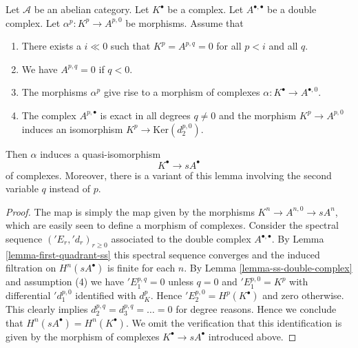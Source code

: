 \begin{lemma}
\label{lemma-double-complex-gives-resolution}
Let $\mathcal{A}$ be an abelian category.
Let $K^\bullet$ be a complex.
Let $A^{\bullet, \bullet}$ be a double complex.
Let $\alpha^p : K^p \to A^{p, 0}$ be morphisms.
Assume that
\begin{enumerate}
\item There exists a $i \ll 0$ such that
$K^p = A^{p, q} = 0$ for all $p < i$ and all $q$.
\item We have $A^{p, q} = 0$ if $q < 0$.
\item The morphisms $\alpha^p$ give rise to a morphism
of complexes $\alpha : K^\bullet \to A^{\bullet, 0}$.
\item The complex $A^{p, \bullet}$ is exact in all degrees
$q \not = 0$ and the morphism $K^p \to A^{p, 0}$ induces
an isomorphism $K^p \to \text{Ker}(d_2^{p, 0})$.
\end{enumerate}
Then $\alpha$ induces a quasi-isomorphism
$$
K^\bullet \longrightarrow sA^\bullet
$$
of complexes.
Moreover, there is a variant of this lemma involving the second
variable $q$ instead of $p$.
\end{lemma}

\begin{proof}
The map is simply the map given by the morphisms
$K^n \to A^{n, 0} \to sA^n$, which are easily seen to define
a morphism of complexes.
Consider the spectral sequence $({}'E_r, {}'d_r)_{r \geq 0}$
associated to the double complex $A^{\bullet, \bullet}$.
By Lemma \ref{lemma-first-quadrant-ss} this spectral sequence converges
and the induced filtration on $H^n(sA^\bullet)$ is finite for each $n$.
By Lemma \ref{lemma-ss-double-complex} and assumption (4) we have
${}'E_1^{p, q} = 0$ unless $q = 0$ and $'E_1^{p, 0} = K^p$
with differential ${}'d_1^{p, 0}$ identified with $d_K^p$.
Hence ${}'E_2^{p, 0} = H^p(K^\bullet)$ and zero otherwise.
This clearly implies $d_2^{p, q} = d_3^{p, q} = \ldots = 0$
for degree reasons. Hence we conclude that $H^n(sA^\bullet) = H^n(K^\bullet)$.
We omit the verification that this identification is given by the
morphism of complexes $K^\bullet \to sA^\bullet$ introduced above.
\end{proof}

